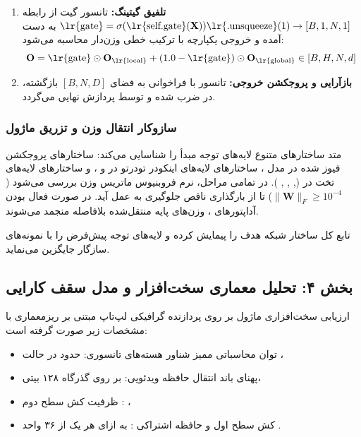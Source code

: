 \begin{enumerate}
    \item \textbf{تلفیق گیتینگ:} تانسور گیت از رابطه $\text{\lr{gate}} = \sigma(\text{\lr{self.gate}}(\mathbf{X}))\text{\lr{.unsqueeze}}(1) \to [B, 1, N, 1]$ به دست آمده و خروجی یکپارچه با ترکیب خطی وزن‌دار محاسبه می‌شود:
    \begin{equation}
    \mathbf{O} = \text{\lr{gate}} \odot \mathbf{O}_{\text{\lr{local}}} + (1.0 - \text{\lr{gate}}) \odot \mathbf{O}_{\text{\lr{global}}} \in [B, H, N, d]
    \end{equation}
    \item \textbf{بازآرایی و پروجکشن خروجی:} تانسور با فراخوانی  به فضای $[B, N, D]$ بازگشته، در  ضرب شده و توسط  پردازش نهایی می‌گردد.
\end{enumerate}

\subsubsection*{سازوکار انتقال وزن  و تزریق ماژول }
متد  ساختارهای متنوع لایه‌های توجه مبدأ را شناسایی می‌کند: ساختارهای پروجکشن فیوز شده در مدل  ، ساختارهای لایه‌های اینکودر تودرتو در  و  ، و ساختارهای لایه‌های تخت در  (, , , ). در تمامی مراحل، نرم فروبنیوس ماتریس وزن بررسی می‌شود ($\|\mathbf{W}\|_F \ge 10^{-4}$) تا از بارگذاری ناقص جلوگیری به عمل آید. در صورت فعال بودن آداپتورهای ، وزن‌های پایه منتقل‌شده بلافاصله منجمد می‌شوند.

تابع  کل ساختار شبکه هدف را پیمایش کرده و لایه‌های توجه پیش‌فرض را با نمونه‌های سازگار  جایگزین می‌نماید.

\subsection*{بخش ۴: تحلیل معماری سخت‌افزار و مدل سقف کارایی }
ارزیابی سخت‌افزاری ماژول بر روی پردازنده گرافیکی لپ‌تاپ  مبتنی بر ریزمعماری  با مشخصات زیر صورت گرفته است:
\begin{itemize}
    \item توان محاسباتی ممیز شناور هسته‌های تانسوری: حدود  در حالت ،
    \item پهنای باند انتقال حافظه ویدئویی:  بر روی گذرگاه ۱۲۸ بیتی،
    \item ظرفیت کش سطح دوم : ،
    \item کش سطح اول و حافظه اشتراکی :  به ازای هر یک از ۳۶ واحد .
\end{itemize}

